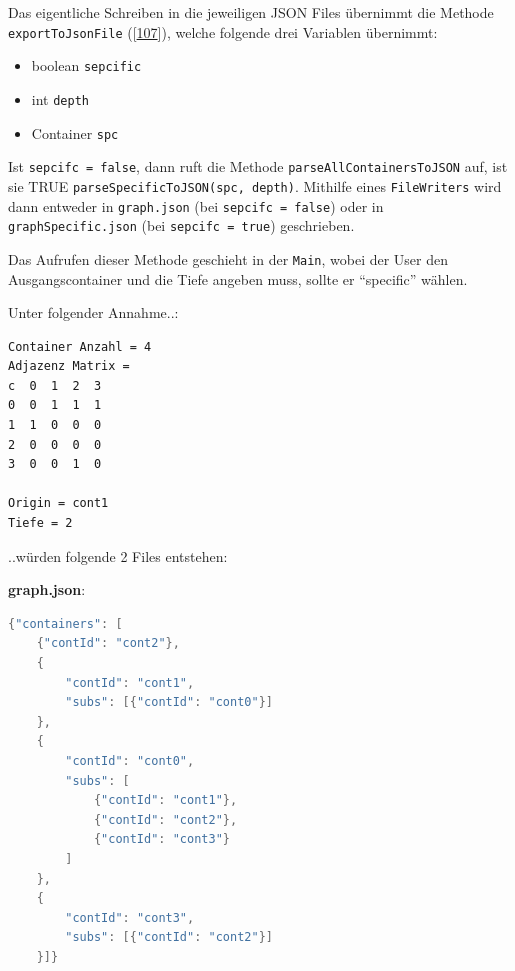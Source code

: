 \documentclass[
    headings=optiontotocandhead,%
    twoside,
    numbers=noenddot,%
    12pt, %
    titlepage, %
    parskip=full, %
    listof=leveldown, 
    numbers=noenddot, %
    a4paper,DIV=14,
    BCOR=15mm,
]{scrbook}
\newcommand{\passthrough}[1]{#1}
\providecommand{\tightlist}{%
  \setlength{\itemsep}{0pt}\setlength{\parskip}{0pt}}
\begin{document}
Das eigentliche Schreiben in die jeweiligen JSON Files übernimmt die
Methode \passthrough{\lstinline!exportToJsonFile!}
({[}\protect\hyperlink{ref-gpt-SpecificJson}{107}{]}), welche folgende
drei Variablen übernimmt:

\begin{itemize}
\tightlist
\item
  boolean \passthrough{\lstinline!sepcific!}
\item
  int \passthrough{\lstinline!depth!}
\item
  Container \passthrough{\lstinline!spc!}
\end{itemize}

Ist \passthrough{\lstinline!sepcifc = false!}, dann ruft die Methode
\passthrough{\lstinline!parseAllContainersToJSON!} auf, ist sie TRUE
\passthrough{\lstinline!parseSpecificToJSON(spc, depth)!}. Mithilfe
eines \passthrough{\lstinline!FileWriters!} wird dann entweder in
\passthrough{\lstinline!graph.json!} (bei
\passthrough{\lstinline!sepcifc = false!}) oder in
\passthrough{\lstinline!graphSpecific.json!} (bei
\passthrough{\lstinline!sepcifc = true!}) geschrieben.

Das Aufrufen dieser Methode geschieht in der
\passthrough{\lstinline!Main!}, wobei der User den Ausgangscontainer und
die Tiefe angeben muss, sollte er ``specific'' wählen.

Unter folgender Annahme..:

\begin{lstlisting}[caption={Beispiel für das JSON Erstellen basierend auf einem Container Geflecht mit Angabe der Tiefe und Origin}]
Container Anzahl = 4
Adjazenz Matrix =
c  0  1  2  3
0  0  1  1  1 
1  1  0  0  0 
2  0  0  0  0 
3  0  0  1  0 

Origin = cont1
Tiefe = 2
\end{lstlisting}

..würden folgende 2 Files entstehen:

\textbf{graph.json}:

\begin{lstlisting}[language=Java, caption={Erstelltes graph.json File basierend auf den obrigen Beispiel}]
{"containers": [
    {"contId": "cont2"},
    {
        "contId": "cont1",
        "subs": [{"contId": "cont0"}]
    },
    {
        "contId": "cont0",
        "subs": [
            {"contId": "cont1"},
            {"contId": "cont2"},
            {"contId": "cont3"}
        ]
    },
    {
        "contId": "cont3",
        "subs": [{"contId": "cont2"}]
    }]}
\end{lstlisting}
\end{document}
